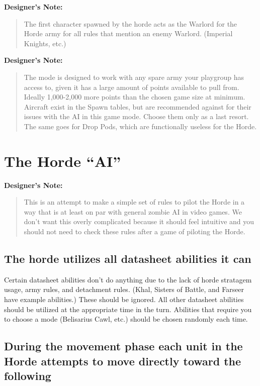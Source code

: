 \documentclass{HordeModeTarot}
\begin{document}
\textbf{Designer's Note:}

\begin{quote}
The first character spawned by the horde acts as the Warlord for the Horde army for all rules that mention an enemy Warlord. (Imperial Knights, etc.)
\end{quote}

\textbf{Designer's Note:}

\begin{quote}
The mode is designed to work with any spare army your playgroup has access to, given it has a large amount of points available to pull from.  Ideally 1,000-2,000 more points than the chosen game size at minimum. Aircraft exist in the Spawn tables, but are recommended against for their issues with the AI in this game mode.  Choose them only as a last resort.  The same goes for Drop Pods, which are functionally useless for the Horde.
\end{quote}

\section{The Horde “AI”}\hypertarget{horde-ai}{}\label{horde-ai}

\textbf{Designer's Note:}

\begin{quote}
This is an attempt to make a simple set of rules to pilot the Horde in a way that is at least on par with general zombie AI in video games.  We don't want this overly complicated because it should feel intuitive and you should not need to check these rules after a game of piloting the Horde.
\end{quote}

\subsection*{The horde utilizes all datasheet abilities it can}

Certain datasheet abilities don't do anything due to the lack of horde stratagem usage, army rules, and detachment rules. (Khal, Sisters of Battle, and Farseer have example abilities.)  These should be ignored.  All other datasheet abilities should be utilized at the appropriate time in the turn.  Abilities that require you to choose a mode (Belisarius Cawl, etc.) should be chosen randomly each time.

\subsection*{During the movement phase each unit in the Horde attempts to move directly toward the following}
\end{document}
